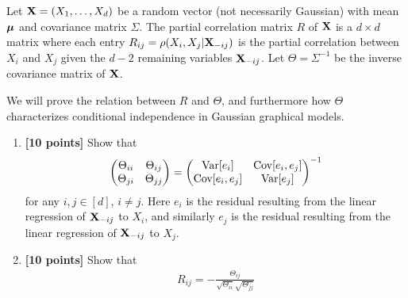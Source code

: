 \documentclass{article}
\begin{document}
Let $ \mathbf{X} = (X_1, \dotsc, X_d) $ be a random vector (not necessarily Gaussian) with mean $ \boldsymbol{\mu} $ and covariance matrix $ \Sigma $. 
The partial correlation matrix $ R $ of $ \mathbf{X} $ is a $ d \times d $ matrix where each entry $ R_{ij} = \rho (X_i, X_j | \mathbf{X}_{-ij}) $ is the partial correlation between $ X_i $ and $ X_j $ given the $ d-2 $ remaining variables $ \mathbf{X}_{-ij} $.
Let $ \Theta = \Sigma^{-1} $ be the inverse covariance matrix of $ \mathbf{X} $. 



We will prove the relation between $ R $ and $ \Theta $, and furthermore how $ \Theta $ characterizes conditional independence in Gaussian graphical models. 





\begin{enumerate}
\item 
\textbf{[10 points]}
Show that 
\begin{align}
\begin{pmatrix}
\Theta_{ii} & \Theta_{ij} \\
\Theta_{ji} & \Theta_{jj}
\end{pmatrix}
= \begin{pmatrix}
\text{Var} [e_i] & \text{Cov} [e_i, e_j] \\
\text{Cov} [e_i, e_j] & \text{Var} [e_j]
\end{pmatrix}^{-1}
\end{align}
for any $ i, j \in [d] $, $ i \ne j $. 
Here $ e_i $ is the residual resulting from the linear regression of $ \mathbf{X}_{-ij} $ to $ X_i $, and similarly $ e_j $ is the residual resulting from the linear regression of $ \mathbf{X}_{-ij} $ to $ X_j $. 










\item 
\textbf{[10 points]}
Show that
\begin{align}
R_{ij}
= - \frac{\Theta_{ij}}{\sqrt{\Theta_{ii}} \sqrt{\Theta_{jj}}}
\end{align}
















\end{enumerate}
\end{document}
